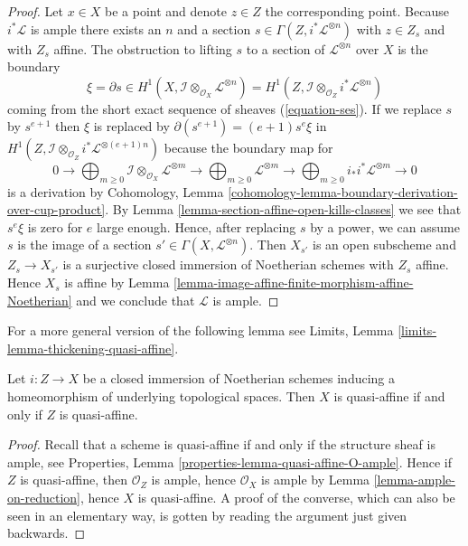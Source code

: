 \begin{proof}
\medskip\noindent
Let $x \in X$ be a point and denote $z \in Z$ the corresponding point.
Because $i^*\mathcal{L}$ is ample there exists an $n$ and a section
$s \in \Gamma(Z, i^*\mathcal{L}^{\otimes n})$ with $z \in Z_s$
and with $Z_s$ affine. The obstruction to lifting $s$ to a section
of $\mathcal{L}^{\otimes n}$ over $X$ is the boundary
$$
\xi = \partial s \in
H^1(X, \mathcal{I} \otimes_{\mathcal{O}_X} \mathcal{L}^{\otimes n}) =
H^1(Z, \mathcal{I} \otimes_{\mathcal{O}_Z} i^*\mathcal{L}^{\otimes n})
$$
coming from the short exact sequence of sheaves (\ref{equation-ses}).
If we replace $s$ by $s^{e + 1}$ then $\xi$ is replaced by
$\partial(s^{e + 1}) = (e + 1) s^e \xi$ in
$H^1(Z, \mathcal{I} \otimes_{\mathcal{O}_Z} i^*\mathcal{L}^{\otimes (e + 1)n})$
because the boundary map for
$$
0 \to
\bigoplus\nolimits_{m \geq 0}
\mathcal{I} \otimes_{\mathcal{O}_X} \mathcal{L}^{\otimes m} \to
\bigoplus\nolimits_{m \geq 0}
\mathcal{L}^{\otimes m} \to
\bigoplus\nolimits_{m \geq 0}
i_*i^*\mathcal{L}^{\otimes m} \to 0
$$
is a derivation by Cohomology, Lemma
\ref{cohomology-lemma-boundary-derivation-over-cup-product}. By
Lemma \ref{lemma-section-affine-open-kills-classes}
we see that $s^e \xi$ is zero for $e$ large enough.
Hence, after replacing $s$ by a power, we can assume $s$ is the image
of a section $s' \in \Gamma(X, \mathcal{L}^{\otimes n})$.
Then $X_{s'}$ is an open subscheme and $Z_s \to X_{s'}$ is a surjective
closed immersion of Noetherian schemes with $Z_s$ affine. Hence
$X_s$ is affine by
Lemma \ref{lemma-image-affine-finite-morphism-affine-Noetherian} and
we conclude that $\mathcal{L}$ is ample.
\end{proof}

\noindent
For a more general version of the following lemma see
Limits, Lemma \ref{limits-lemma-thickening-quasi-affine}.

\begin{lemma}
\label{lemma-thickening-quasi-affine}
Let $i : Z \to X$ be a closed immersion of Noetherian schemes
inducing a homeomorphism of underlying topological spaces.
Then $X$ is quasi-affine if and only if $Z$ is quasi-affine.
\end{lemma}

\begin{proof}
Recall that a scheme is quasi-affine
if and only if the structure sheaf is ample, see
Properties, Lemma \ref{properties-lemma-quasi-affine-O-ample}.
Hence if $Z$ is quasi-affine, then $\mathcal{O}_Z$ is ample,
hence $\mathcal{O}_X$ is ample by
Lemma \ref{lemma-ample-on-reduction}, hence
$X$ is quasi-affine. A proof of the converse, which
can also be seen in an elementary way, is gotten by
reading the argument just given backwards.
\end{proof}







